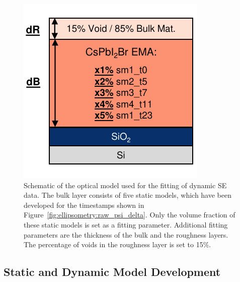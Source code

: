 \begin{figure}
  \centering
  \medskip
  \includegraphics[width=.4\textwidth]{chapters/ellipsometry/image/Dynamic_Model.pdf}
  \caption{Schematic of the optical model used for the fitting of dynamic SE data. The bulk layer consists of five static models, which have been developed for the timestamps shown in Figure~\ref{fig:ellipsometry:raw_psi_delta}. Only the volume fraction of these static models is set as a fitting parameter. Additional fitting parameters are the thickness of the bulk and the roughness layers. The percentage of voids in the roughness layer is set to 15\%.}
  \label{fig:ellipsometry:dynamic_model}
\end{figure}



\subsection{Static and Dynamic Model Development}

